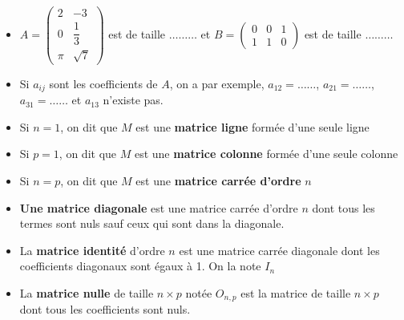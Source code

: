 \documentclass[a4paper]{article}
\begin{document}
\begin{example}{}{}
	
\begin{itemize}[label=\textbullet]
	\item $A=\begin{pmatrix}
2 & -3 \\
0 & \dfrac{1}{3} \\
\pi & \sqrt{7} 
\end{pmatrix}$ est de taille $\ldots\ldots\ldots$ et $B=\begin{pmatrix}
0 & 0 & 1 \\
1 & 1 & 0 
\end{pmatrix}$ est de taille $\ldots\ldots\ldots$

\item Si $a_{ij}$ sont les coefficients de $A$, on a par exemple, $a_{12}=\ldots\ldots$, $a_{21}=\ldots\ldots$, $a_{31}=\ldots\ldots$ et $a_{13}$ n'existe pas.
\end{itemize}


\end{example}



\bigskip
\begin{definition}{}{}

\begin{itemize}[label=\textbullet]
	\item Si $n=1$, on dit que $M$ est une \textbf{matrice ligne} formée d'une seule ligne
	\item Si $p=1$, on dit que $M$ est une \textbf{matrice colonne} formée d'une seule colonne
	\item Si $n=p$, on dit que $M$ est une \textbf{matrice carrée d'ordre} $n$
	\item \textbf{Une matrice diagonale} est une matrice carrée d'ordre $n$ dont tous les termes sont nuls sauf ceux qui sont dans la diagonale. 
	\item La \textbf{matrice identité} d'ordre $n$ est une matrice carrée diagonale dont les coefficients diagonaux sont égaux à 1. On la note $I_n$
	\item La \textbf{matrice nulle} de taille $n\times p$ notée $O_{n,p}$ est la matrice de taille $n \times p$ dont tous les coefficients sont nuls.
\end{itemize}	
\end{definition}
\end{document}
